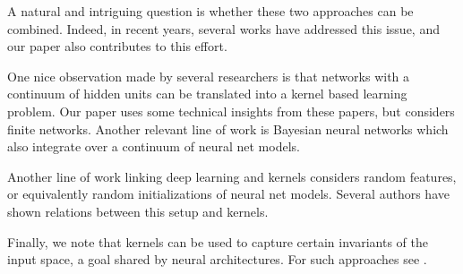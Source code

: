 A natural and intriguing question is whether these two approaches can be combined. Indeed, in recent years, several works have addressed this issue, and our paper  also contributes to this effort.

One nice observation made by several researchers \cite{le2007continuous,cho2009kernel} is that networks with a continuum of hidden units can be translated into a kernel based learning problem. Our paper   uses some technical insights from these papers, but considers finite networks. Another relevant line of work is Bayesian neural networks  which also integrate over a continuum of neural net models.

Another line of work linking deep learning and kernels considers random features, or equivalently random initializations of neural net models. Several authors have shown relations between this setup and kernels. 

Finally, we note that kernels can be used to capture certain invariants of the input space, a goal shared by neural architectures. For such approaches see .


